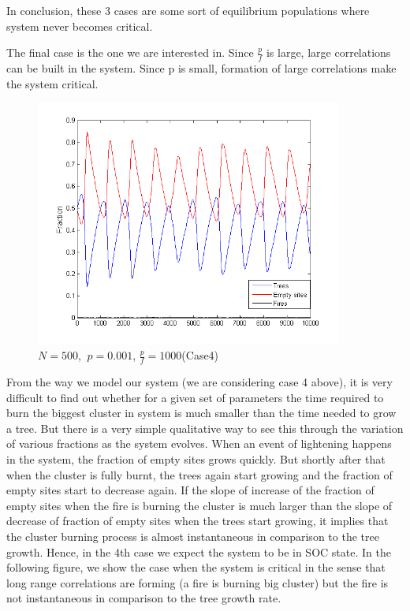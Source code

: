 \documentclass[11pt]{article}
\begin{document}
In conclusion, these 3 cases are some sort of equilibrium populations where system never becomes critical.

The final case is the one we are interested in. Since $\frac{p}{f}$ is large, large correlations can be built in the system. Since p is small, formation of large correlations make the system critical.
\begin{figure}[H]
\centering
\includegraphics[width=0.9\textwidth,keepaspectratio=true,]{Pictures/case4_size500_10000iter_p_0point001_ratio_1000.png}
\caption{$N=500$, $\ p=0.001$, $\frac{p}{f}=1000$(Case4)}
\end{figure}

From the way we model our system (we are considering case 4 above), it is very difficult to find out whether for a given set of parameters the time required to burn the biggest cluster in system is much smaller than the time needed to grow a tree. But there is a very simple qualitative way to see this through the variation of various fractions as the system evolves. When an event of lightening happens in the system, the fraction of empty sites grows quickly. But shortly after that when the cluster is fully burnt, the trees again start growing and the fraction of empty sites start to decrease again. If the slope of increase of the fraction of empty sites when the fire is burning the cluster is much larger than the slope of decrease of fraction of empty sites when the trees start growing, it implies that the cluster burning process is almost instantaneous in comparison to the tree growth. Hence, in the 4th case we expect the system to be in SOC state. In the following figure, we show the case when the system is critical in the sense that long range correlations are forming (a fire is burning big cluster) but the fire is not instantaneous in comparison to the tree growth rate.
\end{document}
